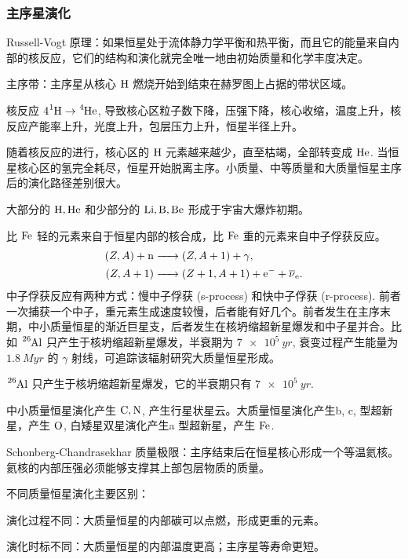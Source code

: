 \documentclass[../天体物理基础.tex]{subfiles}
\begin{document}
\subsubsection{主序星演化}
Russell-Vogt 原理：如果恒星处于流体静力学平衡和热平衡，而且它的能量来自内部的核反应，它们的结构和演化就完全唯一地由初始质量和化学丰度决定。

主序带：主序星从核心 $\ce{H}$ 燃烧开始到结束在赫罗图上占据的带状区域。

核反应 $4\ce{^{1}H}\to\ce{^{4}He}$, 导致核心区粒子数下降，压强下降，核心收缩，温度上升，核反应产能率上升，光度上升，包层压力上升，恒星半径上升。

随着核反应的进行，核心区的 $\ce{H}$ 元素越来越少，直至枯竭，全部转变成 $\ce{He}$. 当恒星核心区的氢完全耗尽，恒星开始脱离主序。小质量、中等质量和大质量恒星主序后的演化路径差别很大。

大部分的 $\ce{H, He}$ 和少部分的 $\ce{Li, B, Be}$ 形成于宇宙大爆炸初期。

比 $\ce{Fe}$ 轻的元素来自于恒星内部的核合成，比 $\ce{Fe}$ 重的元素来自中子俘获反应。
\begin{align}
\mleft(Z, A\mright)+\ce{n &->}\mleft(Z, A+1\mright)+\gamma,\\
\mleft(Z, A+1\mright)\ce{&->}\mleft(Z+1, A+1\mright)+\ce{e-}+\overline{\nu}_{\ce{e}}.
\end{align}
中子俘获反应有两种方式：慢中子俘获 (s-process) 和快中子俘获 (r-process). 前者一次捕获一个中子，重元素生成速度较慢，后者能有好几个。前者发生在主序末期，中小质量恒星的渐近巨星支，后者发生在核坍缩超新星爆发和中子星并合。比如 $\ce{^{26}Al}$ 只产生于核坍缩超新星爆发，半衰期为 $\qty{7e5}{yr}$, 衰变过程产生能量为 $\qty{1.8}{Myr}$ 的 $\gamma$ 射线，可追踪该辐射研究大质量恒星形成。

$\ce{^{26}Al}$ 只产生于核坍缩超新星爆发，它的半衰期只有 $\qty{7e5}{yr}$.

中小质量恒星演化产生 $\ce{C, N}$, 产生行星状星云。大质量恒星演化产生\uppercase\expandafter{}b, \uppercase\expandafter{}c, \uppercase\expandafter{}型超新星，产生 $\ce{O}$, 白矮星双星演化产生\uppercase\expandafter{}a 型超新星，产生 $\ce{Fe}$.

Schonberg-Chandrasekhar 质量极限：主序结束后在恒星核心形成一个等温氦核。氦核的内部压强必须能够支撑其上部包层物质的质量。

不同质量恒星演化主要区别：

演化过程不同：大质量恒星的内部碳可以点燃，形成更重的元素。

演化时标不同：大质量恒星的内部温度更高；主序星等寿命更短。
\end{document}
